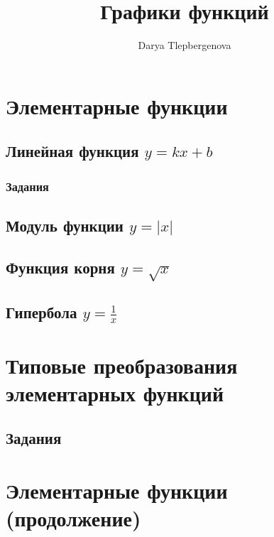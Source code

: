 \documentclass[12pt,a4paper]{scrartcl}
\title{Графики функций}
\author{Darya Tlepbergenova}
\begin{document}
\maketitle

\pagestyle{plain}
\tableofcontents %

\newpage


\newpage
\section{Элементарные функции}

\subsection{Линейная функция $y=kx+b$}

\subsubsection{Задания}

\newpage

\subsection{Модуль функции $y=|x|$}


\subsection{Функция корня $y= \sqrt{x}$}



\subsection{Гипербола $y = \frac{1}{x}$}


\newpage

\section{Типовые преобразования элементарных функций}


\subsection{Задания}

\newpage

\section{Элементарные функции (продолжение)}
\end{document}
